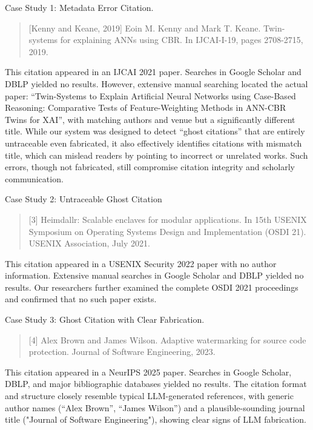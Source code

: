 \begin{casestudybox}{Case Study 1: Metadata Error Citation.}
\begin{quote}
     \small
    [Kenny and Keane, 2019] Eoin M. Kenny and Mark T. Keane. Twin-systems for explaining ANNs using CBR. In IJCAI-I-19, pages 2708-2715, 2019.
\end{quote}
\end{casestudybox}

This citation appeared in an IJCAI 2021 paper. Searches in Google Scholar and DBLP yielded no results. However, extensive manual searching located the actual paper: ``Twin-Systems to Explain Artificial Neural Networks using Case-Based Reasoning: Comparative Tests of Feature-Weighting Methods in ANN-CBR Twins for XAI'', with matching authors and venue but a significantly different title.
While our system was designed to detect ``ghost citations'' that are entirely untraceable even fabricated, it also effectively identifies citations with mismatch title, which can mislead readers by pointing to incorrect or unrelated works. Such errors, though not fabricated, still compromise citation integrity and scholarly communication.

\begin{casestudybox}{Case Study 2: Untraceable Ghost Citation}
\begin{quote}
     \small
    [3] Heimdallr: Scalable enclaves for modular applications. In 15th USENIX Symposium on Operating Systems Design and Implementation (OSDI 21). USENIX Association, July 2021.
\end{quote}
\end{casestudybox}

This citation appeared in a USENIX Security 2022 paper with no author information. Extensive manual searches in Google Scholar and DBLP yielded no results. Our researchers further examined the complete OSDI 2021 proceedings and confirmed that no such paper exists.

\begin{casestudybox}{Case Study 3: Ghost Citation with Clear Fabrication.}
\begin{quote}
    \small
    [4] Alex Brown and James Wilson. Adaptive watermarking for source code protection. Journal of Software Engineering, 2023.
\end{quote}
\end{casestudybox}
This citation appeared in a NeurIPS 2025 paper. Searches in Google Scholar, DBLP, and major bibliographic databases yielded no results. The citation format and structure closely resemble typical LLM-generated references, with generic author names (``Alex Brown'', ``James Wilson'') and a plausible-sounding journal title ("Journal of Software Engineering"), showing clear signs of LLM fabrication.

